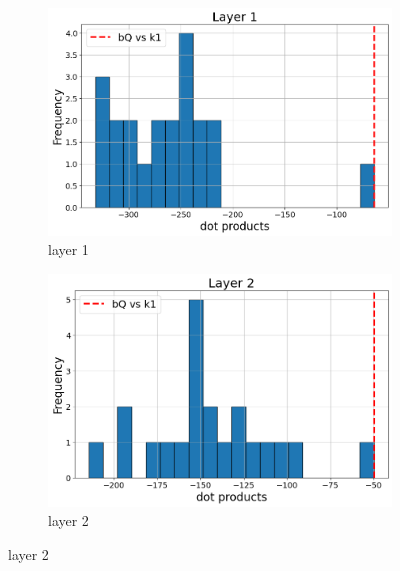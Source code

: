 \documentclass[11pt]{article}
\begin{document}



\appendix

\section{}\label{app:bias_term}

\begin{figure}[t]
  \begin{subfigure}[t]{0.24\textwidth}
    \centering
    \includegraphics[width=1.4\columnwidth]{figures/obs1_appendix/obs1_layer1.png}
    \caption{layer 1}
  \end{subfigure}\hfill
  \begin{subfigure}[t]{0.24\textwidth}
    \centering
    \includegraphics[width=1.4\columnwidth]{figures/obs1_appendix/obs1_layer2.png}
    \caption{layer 2}

\end{subfigure}
\end{figure}
\end{document}
